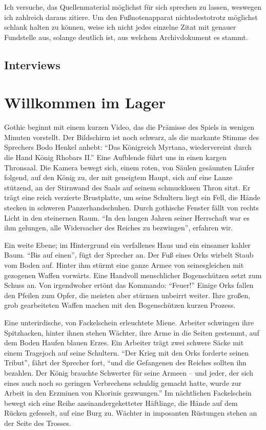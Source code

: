 \documentclass[a5paper,pagesize]{scrbook}
\begin{document}
Ich versuche, das Quellenmaterial möglichst für sich sprechen zu lassen, weswegen ich zahlreich daraus zitiere.
Um den Fußnotenapparat nichtsdestotrotz möglichst schlank halten zu können, weise ich nicht jedes einzelne Zitat mit genauer Fundstelle aus, solange deutlich ist, aus welchem Archivdokument es stammt.


\section{Interviews}\label{ch:quellen_interviews}


\mainmatter
\chapter{Willkommen im Lager}\label{ch:willkommen}
Gothic beginnt mit einem kurzen Video, das die Prämisse des Spiels in wenigen Minuten vorstellt.
Der Bildschirm ist noch schwarz, als die markante Stimme des Sprechers Bodo Henkel anhebt:
\enquote{Das Königreich Myrtana, wiedervereint durch die Hand König Rhobars II.}
Eine Aufblende führt uns in einen kargen Thronsaal.
Die Kamera bewegt sich, einem roten, von Säulen gesäumten Läufer folgend, auf den König zu, der mit geneigtem Haupt, sich auf eine Lanze stützend, an der Stirnwand des Saals auf seinem schmucklosen Thron sitzt.
Er trägt eine reich verzierte Brustplatte, um seine Schultern liegt ein Fell, die Hände stecken in schweren Panzerhandschuhen.
Durch gothische Fenster fällt von rechts Licht in den steinernen Raum.
\enquote{In den langen Jahren seiner Herrschaft war es ihm gelungen, alle Widersacher des Reiches zu bezwingen}, erfahren wir.

Ein weite Ebene; im Hintergrund ein verfallenes Haus und ein einsamer kahler Baum.
\enquote{Bis auf einen}, fügt der Sprecher an.
Der Fuß eines Orks wirbelt Staub vom Boden auf.
Hinter ihm stürmt eine ganze Armee von seinesgleichen mit gezogenen Waffen vorwärts.
Eine Handvoll menschlicher Bogenschützen setzt zum Schuss an.
Von irgendwoher ertönt das Kommando: \enquote{Feuer!}
Einige Orks fallen den Pfeilen zum Opfer, die meisten aber stürmen unbeirrt weiter.
Ihre großen, grob gearbeiteten Waffen machen mit den Bogenschützen kurzen Prozess.

Eine unterirdische, von Fackelschein erleuchtete Miene.
Arbeiter schwingen ihre Spitzhacken, hinter ihnen stehen Wächter, ihre Arme in die Seiten gestemmt, auf dem Boden Haufen blauen Erzes.
Ein Arbeiter trägt zwei schwere Säcke mit einem Tragejoch auf seine Schultern.
\enquote{Der Krieg mit den Orks forderte seinen Tribut}, fährt der Sprecher fort, \enquote{und die Gefangenen des Reiches sollten ihn bezahlen.
Der König brauchte Schwerter für seine Armeen -- und jeder, der sich eines auch noch so geringen Verbrechens schuldig gemacht hatte, wurde zur Arbeit in den Erzminen von Khorinis gezwungen.}
Im nächtlichen Fackelschein bewegt sich eine Reihe aneinandergeketteter Häftlinge, die Hände auf dem Rücken gefesselt, auf eine Burg zu.
Wächter in imposanten Rüstungen stehen an der Seite des Trosses.
\end{document}
